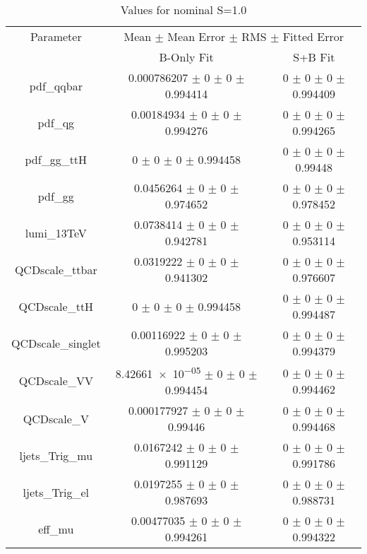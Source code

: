 \begin{table}
\centering
\caption{Values for nominal S=1.0}
\begin{tabular}{ccc}
\toprule
Parameter 	& \multicolumn{2}{c}{Mean $\pm$ Mean Error $\pm$ RMS $\pm$ Fitted Error}\\
 	& B-Only Fit & S+B Fit\\
\midrule
pdf\_qqbar 	& \num{0.000786207} $\pm$ \num{0} $\pm$ \num{0} $\pm$ \num{0.994414} 	& \num{0} $\pm$ \num{0} $\pm$ \num{0} $\pm$ \num{0.994409}\\
pdf\_qg 	& \num{0.00184934} $\pm$ \num{0} $\pm$ \num{0} $\pm$ \num{0.994276} 	& \num{0} $\pm$ \num{0} $\pm$ \num{0} $\pm$ \num{0.994265}\\
pdf\_gg\_ttH 	& \num{0} $\pm$ \num{0} $\pm$ \num{0} $\pm$ \num{0.994458} 	& \num{0} $\pm$ \num{0} $\pm$ \num{0} $\pm$ \num{0.99448}\\
pdf\_gg 	& \num{0.0456264} $\pm$ \num{0} $\pm$ \num{0} $\pm$ \num{0.974652} 	& \num{0} $\pm$ \num{0} $\pm$ \num{0} $\pm$ \num{0.978452}\\
lumi\_13TeV 	& \num{0.0738414} $\pm$ \num{0} $\pm$ \num{0} $\pm$ \num{0.942781} 	& \num{0} $\pm$ \num{0} $\pm$ \num{0} $\pm$ \num{0.953114}\\
QCDscale\_ttbar 	& \num{0.0319222} $\pm$ \num{0} $\pm$ \num{0} $\pm$ \num{0.941302} 	& \num{0} $\pm$ \num{0} $\pm$ \num{0} $\pm$ \num{0.976607}\\
QCDscale\_ttH 	& \num{0} $\pm$ \num{0} $\pm$ \num{0} $\pm$ \num{0.994458} 	& \num{0} $\pm$ \num{0} $\pm$ \num{0} $\pm$ \num{0.994487}\\
QCDscale\_singlet 	& \num{0.00116922} $\pm$ \num{0} $\pm$ \num{0} $\pm$ \num{0.995203} 	& \num{0} $\pm$ \num{0} $\pm$ \num{0} $\pm$ \num{0.994379}\\
QCDscale\_VV 	& \num{8.42661e-05} $\pm$ \num{0} $\pm$ \num{0} $\pm$ \num{0.994454} 	& \num{0} $\pm$ \num{0} $\pm$ \num{0} $\pm$ \num{0.994462}\\
QCDscale\_V 	& \num{0.000177927} $\pm$ \num{0} $\pm$ \num{0} $\pm$ \num{0.99446} 	& \num{0} $\pm$ \num{0} $\pm$ \num{0} $\pm$ \num{0.994468}\\
ljets\_Trig\_mu 	& \num{0.0167242} $\pm$ \num{0} $\pm$ \num{0} $\pm$ \num{0.991129} 	& \num{0} $\pm$ \num{0} $\pm$ \num{0} $\pm$ \num{0.991786}\\
ljets\_Trig\_el 	& \num{0.0197255} $\pm$ \num{0} $\pm$ \num{0} $\pm$ \num{0.987693} 	& \num{0} $\pm$ \num{0} $\pm$ \num{0} $\pm$ \num{0.988731}\\
eff\_mu 	& \num{0.00477035} $\pm$ \num{0} $\pm$ \num{0} $\pm$ \num{0.994261} 	& \num{0} $\pm$ \num{0} $\pm$ \num{0} $\pm$ \num{0.994322}\\

\end{tabular}
\end{table}
